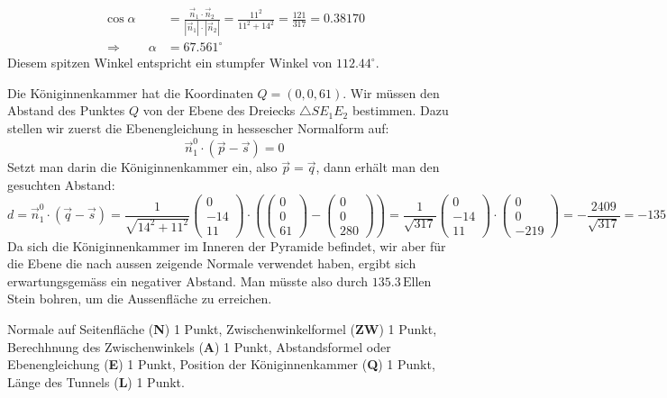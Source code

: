 \begin{loesung}
\begin{teilaufgaben}
\begin{align*}
\cos\alpha
&=
\frac{\vec n_1\cdot \vec n_2}{|\vec n_1|\cdot|\vec n_2|}
=
\frac{11^2}{11^2+14^2}=\frac{121}{317}=0.38170
\\
\Rightarrow\qquad
\alpha
&=
67.561^\circ
\end{align*}
Diesem spitzen Winkel entspricht ein stumpfer Winkel von $112.44^\circ$.
\item
Die Königinnenkammer hat die Koordinaten $Q=(0,0,61)$.
Wir müssen den Abstand des Punktes $Q$ von der Ebene des Dreiecks
$\triangle SE_1E_2$ bestimmen.
Dazu stellen wir zuerst die Ebenengleichung in hessescher Normalform
auf:
\[
\vec n_1^0 \cdot (\vec p-\vec s)=0
\]
Setzt man darin die Königinnenkammer ein,  also $\vec p=\vec q$, dann
erhält man den gesuchten Abstand:
\[
d
=
\vec n_1^0 \cdot (\vec q-\vec s)
=
\frac1{\sqrt{14^2+11^2}}
\begin{pmatrix}0\\-14\\11 \end{pmatrix}
\cdot
\left(
\begin{pmatrix}0\\0\\61\end{pmatrix}
-
\begin{pmatrix}0\\0\\280\end{pmatrix}
\right)
=
\frac1{\sqrt{317}}
\begin{pmatrix}0\\-14\\11 \end{pmatrix}
\cdot
\begin{pmatrix}0\\0\\-219\end{pmatrix}
=
-\frac{2409}{\sqrt{317}}=-135.30
\]
Da sich die Königinnenkammer im Inneren der Pyramide befindet, wir aber
für die Ebene die nach aussen zeigende Normale verwendet haben, ergibt
sich erwartungsgemäss ein negativer Abstand.
Man müsste also durch $135.3\,\text{Ellen}$ Stein bohren, um die Aussenfläche
zu erreichen.
\qedhere
\end{teilaufgaben}
\end{loesung}

\begin{bewertung}
Normale auf Seitenfläche ({\bf N}) 1 Punkt,
Zwischenwinkelformel ({\bf ZW}) 1 Punkt,
Berechhnung des Zwischenwinkels ({\bf A}) 1 Punkt,
Abstandsformel oder Ebenengleichung ({\bf E}) 1 Punkt,
Position der Königinnenkammer ({\bf Q}) 1 Punkt,
Länge des Tunnels ({\bf L}) 1 Punkt.
\end{bewertung}

